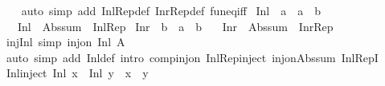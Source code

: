 \begin{isabellebody}
%
\isadelimproof
\ \ %
\endisadelimproof
%
\isatagproof
{}\isamarkupfalse%
\ {\isacharparenleft}{\kern0pt}auto\ simp\ add{\isacharcolon}{\kern0pt}\ Inl{\isacharunderscore}{\kern0pt}Rep{\isacharunderscore}{\kern0pt}def\ Inr{\isacharunderscore}{\kern0pt}Rep{\isacharunderscore}{\kern0pt}def\ fun{\isacharunderscore}{\kern0pt}eq{\isacharunderscore}{\kern0pt}iff{\isacharparenright}{\kern0pt}%
\endisatagproof
{\isafoldproof}%
%
\isadelimproof
\isanewline
%
\endisadelimproof
\isanewline
{}\isamarkupfalse%
\ Inl\ {\isacharcolon}{\kern0pt}{\isacharcolon}{\kern0pt}\ {\isachardoublequoteopen}{\isacharprime}{\kern0pt}a\ {\isasymRightarrow}\ {\isacharprime}{\kern0pt}a\ {\isacharplus}{\kern0pt}\ {\isacharprime}{\kern0pt}b{\isachardoublequoteclose}\isanewline
\ \ \ {\isachardoublequoteopen}Inl\ {\isacharequal}{\kern0pt}\ Abs{\isacharunderscore}{\kern0pt}sum\ {\isasymcirc}\ Inl{\isacharunderscore}{\kern0pt}Rep{\isachardoublequoteclose}\isanewline
\isanewline
{}\isamarkupfalse%
\ Inr\ {\isacharcolon}{\kern0pt}{\isacharcolon}{\kern0pt}\ {\isachardoublequoteopen}{\isacharprime}{\kern0pt}b\ {\isasymRightarrow}\ {\isacharprime}{\kern0pt}a\ {\isacharplus}{\kern0pt}\ {\isacharprime}{\kern0pt}b{\isachardoublequoteclose}\isanewline
\ \ \ {\isachardoublequoteopen}Inr\ {\isacharequal}{\kern0pt}\ Abs{\isacharunderscore}{\kern0pt}sum\ {\isasymcirc}\ Inr{\isacharunderscore}{\kern0pt}Rep{\isachardoublequoteclose}\isanewline
\isanewline
{}\isamarkupfalse%
\ inj{\isacharunderscore}{\kern0pt}Inl\ {\isacharbrackleft}{\kern0pt}simp{\isacharbrackright}{\kern0pt}{\isacharcolon}{\kern0pt}\ {\isachardoublequoteopen}inj{\isacharunderscore}{\kern0pt}on\ Inl\ A{\isachardoublequoteclose}\isanewline
%
\isadelimproof
\ \ %
\endisadelimproof
%
\isatagproof
{}\isamarkupfalse%
\ {\isacharparenleft}{\kern0pt}auto\ simp\ add{\isacharcolon}{\kern0pt}\ Inl{\isacharunderscore}{\kern0pt}def\ intro{\isacharbang}{\kern0pt}{\isacharcolon}{\kern0pt}\ comp{\isacharunderscore}{\kern0pt}inj{\isacharunderscore}{\kern0pt}on\ Inl{\isacharunderscore}{\kern0pt}Rep{\isacharunderscore}{\kern0pt}inject\ inj{\isacharunderscore}{\kern0pt}on{\isacharunderscore}{\kern0pt}Abs{\isacharunderscore}{\kern0pt}sum\ Inl{\isacharunderscore}{\kern0pt}RepI{\isacharparenright}{\kern0pt}%
\endisatagproof
{\isafoldproof}%
%
\isadelimproof
\isanewline
%
\endisadelimproof
\isanewline
{}\isamarkupfalse%
\ Inl{\isacharunderscore}{\kern0pt}inject{\isacharcolon}{\kern0pt}\ {\isachardoublequoteopen}Inl\ x\ {\isacharequal}{\kern0pt}\ Inl\ y\ {\isasymLongrightarrow}\ x\ {\isacharequal}{\kern0pt}\ y{\isachardoublequoteclose}\isanewline

\end{isabellebody}
